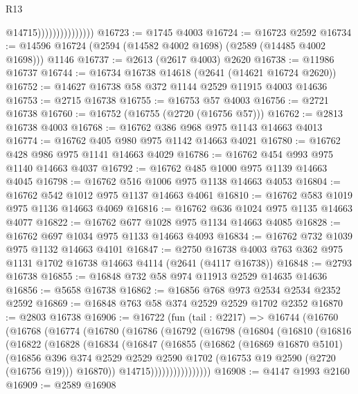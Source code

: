 \begin{lexlean}{R13}
\begin{coremodule}
                                  @14715)))))))))))))))
@16723 := @1745 @4003
@16724 := @16723 @2592
@16734 := @14596 @16724 (@2594 (@14582 @4002 @1698) (@2589 (@14485 @4002 @1698))) @1146
@16737 := @2613 (@2617 @4003) @2620
@16738 := @11986 @16737
@16744 := @16734 @16738 @14618 (@2641 (@14621 @16724 @2620))
@16752 := @14627 @16738 @58 @372 @1144 @2529 @11915 @4003 @14636
@16753 := @2715 @16738
@16755 := @16753 @57 @4003
@16756 := @2721 @16738
@16760 := @16752 (@16755 (@2720 (@16756 @57)))
@16762 := @2813 @16738 @4003
@16768 := @16762 @386 @968 @975 @1143 @14663 @4013
@16774 := @16762 @405 @980 @975 @1142 @14663 @4021
@16780 := @16762 @428 @986 @975 @1141 @14663 @4029
@16786 := @16762 @454 @993 @975 @1140 @14663 @4037
@16792 := @16762 @485 @1000 @975 @1139 @14663 @4045
@16798 := @16762 @516 @1006 @975 @1138 @14663 @4053
@16804 := @16762 @542 @1012 @975 @1137 @14663 @4061
@16810 := @16762 @583 @1019 @975 @1136 @14663 @4069
@16816 := @16762 @636 @1024 @975 @1135 @14663 @4077
@16822 := @16762 @677 @1028 @975 @1134 @14663 @4085
@16828 := @16762 @697 @1034 @975 @1133 @14663 @4093
@16834 := @16762 @732 @1039 @975 @1132 @14663 @4101
@16847 := @2750 @16738 @4003 @763 @362 @975 @1131 @1702 @16738 @14663 @4114 (@2641 (@4117 @16738))
@16848 := @2793 @16738
@16855 := @16848 @732 @58 @974 @11913 @2529 @14635 @14636
@16856 := @5658 @16738
@16862 := @16856 @768 @973 @2534 @2534 @2352 @2592
@16869 := @16848 @763 @58 @374 @2529 @2529 @1702 @2352
@16870 := @2803 @16738
@16906 := @16722
    (fun (tail : @2217) =>
    @16744
      (@16760
        (@16768
          (@16774
            (@16780
              (@16786
                (@16792
                  (@16798
                    (@16804
                      (@16810
                        (@16816
                          (@16822
                            (@16828
                              (@16834
                                (@16847
                                  (@16855
                                    (@16862
                                      (@16869 @16870 @5101)
                                      (@16856
                                        @396
                                        @374
                                        @2529
                                        @2529
                                        @2590
                                        @1702
                                        (@16753 @19 @2590 (@2720 (@16756 @19)))
                                        @16870))
                                    @14715))))))))))))))))
@16908 := @4147 @1993 @2160
@16909 := @2589 @16908

\end{coremodule}
\end{lexlean}
